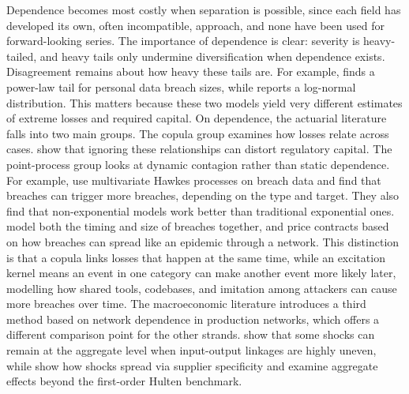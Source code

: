 \documentclass[review]{elsarticle}
\begin{document}
Dependence becomes most costly when separation is possible, since each field has developed its own, often incompatible, approach, and none have been used for forward-looking series. The importance of dependence is clear: severity is heavy-tailed, and heavy tails only undermine diversification when dependence exists. Disagreement remains about how heavy these tails are. For example, \citet{wheatley2016} finds a power-law tail for personal data breach sizes, while \citet{edwards2016} reports a log-normal distribution. This matters because these two models yield very different estimates of extreme losses and required capital. On dependence, the actuarial literature falls into two main groups.
The copula group \citep{xu2018,eling2018,peng2018} examines how losses relate across cases. \citet{carannante2023} show that ignoring these relationships can distort regulatory capital.
The point-process group looks at dynamic contagion rather than static dependence. For example, \citet{bessyroland2021} use multivariate Hawkes processes on breach data and find that breaches can trigger more breaches, depending on the type and target. They also find that non-exponential models work better than traditional exponential ones. \citet{zeller2022} model both the timing and size of breaches together, and \citet{fahrenwaldt2018} price contracts based on how breaches can spread like an epidemic through a network.
This distinction is that a copula links losses that happen at the same time, while an excitation kernel means an event in one category can make another event more likely later, modelling how shared tools, codebases, and imitation among attackers can cause more breaches over time.
The macroeconomic literature introduces a third method based on network dependence in production networks, which offers a different comparison point for the other strands. \citet{acemoglu2012} show that some shocks can remain at the aggregate level when input-output linkages are highly uneven, while \citet{barrot2016} show how shocks spread via supplier specificity and \citet{baqaee2019} examine aggregate effects beyond the first-order Hulten benchmark.
\end{document}
